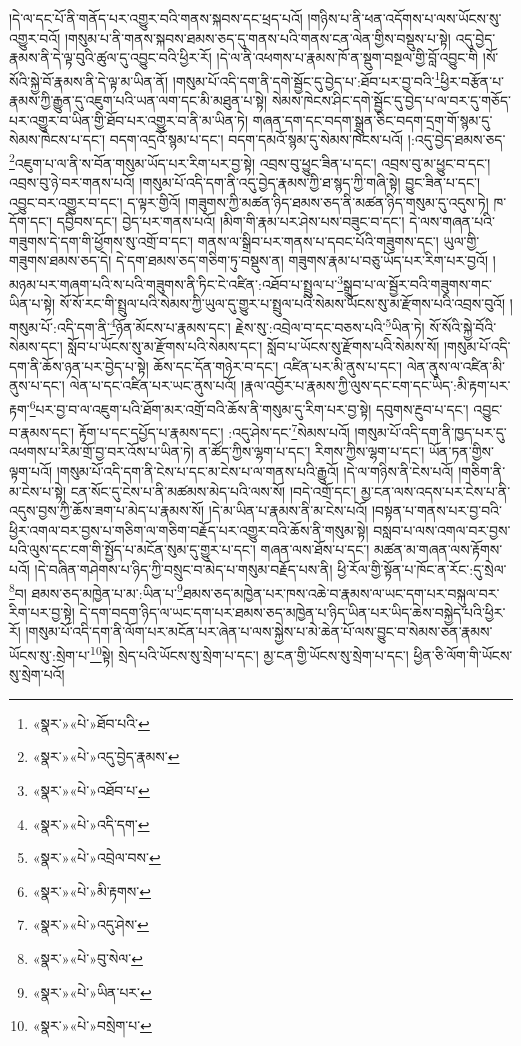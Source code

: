 །དེ་ལ་དང་པོ་ནི་གནོད་པར་འགྱུར་བའི་གནས་སྐབས་དང་ཕྲད་པའོ། །གཉིས་པ་ནི་ཕན་འདོགས་པ་ལས་ཡོངས་སུ་འགྱུར་བའོ། །གསུམ་པ་ནི་གནས་སྐབས་ཐམས་ཅད་དུ་གནས་པའི་གནས་ངན་ལེན་གྱིས་བསྡུས་པ་སྟེ། འདུ་བྱེད་རྣམས་ནི་དེ་ལྟ་བུའི་ཚུལ་དུ་འབྱུང་བའི་ཕྱིར་རོ། །དེ་ལ་ནི་འཕགས་པ་རྣམས་ཁོ་ན་སྡུག་བསྔལ་གྱི་བློ་འབྱུང་གི །སོ་སོའི་སྐྱེ་བོ་རྣམས་ནི་དེ་ལྟ་མ་ཡིན་ནོ། །གསུམ་པོ་འདི་དག་ནི་དགེ་སྦྱོང་དུ་བྱེད་པ་:ཐོབ་པར་བྱ་བའི་\footnote{«སྣར་»«པེ་»ཐོབ་པའི་}ཕྱིར་བརྩོན་པ་རྣམས་ཀྱི་རྒྱུན་དུ་འཇུག་པའི་ཡན་ལག་དང་མི་མཐུན་པ་སྟེ། སེམས་ཁེངས་ཤིང་དགེ་སྦྱོང་དུ་བྱེད་པ་ལ་བར་དུ་གཅོད་པར་འགྱུར་བ་ཡིན་གྱི་ཐོབ་པར་འགྱུར་བ་ནི་མ་ཡིན་ཏེ། གཞན་དག་དང་བདག་སྒྲུན་ཅིང་བདག་དྲག་གོ་སྙམ་དུ་སེམས་ཁེངས་པ་དང་། བདག་འདྲའོ་སྙམ་པ་དང་། བདག་དམའོ་སྙམ་དུ་སེམས་ཁེངས་པའོ། །:འདུ་བྱེད་ཐམས་ཅད་\footnote{«སྣར་»«པེ་»འདུ་བྱེད་རྣམས་}འཇུག་པ་ལ་ནི་ས་བོན་གསུམ་ཡོད་པར་རིག་པར་བྱ་སྟེ། འབྲས་བུ་ཕྱུང་ཟིན་པ་དང་། འབྲས་བུ་མ་ཕྱུང་བ་དང་། འབྲས་བུ་ཉེ་བར་གནས་པའོ། །གསུམ་པོ་འདི་དག་ནི་འདུ་བྱེད་རྣམས་ཀྱི་ཐ་སྙད་ཀྱི་གཞི་སྟེ། བྱུང་ཟིན་པ་དང་། འབྱུང་བར་འགྱུར་བ་དང་། ད་ལྟར་གྱིའོ། །གཟུགས་ཀྱི་མཚན་ཉིད་ཐམས་ཅད་ནི་མཚན་ཉིད་གསུམ་དུ་འདུས་ཏེ། ཁ་དོག་དང་། དབྱིབས་དང་། བྱེད་པར་གནས་པའོ། །མིག་གི་རྣམ་པར་ཤེས་པས་བཟུང་བ་དང་། དེ་ལས་གཞན་པའི་གཟུགས་དེ་དག་གི་ཕྱོགས་སུ་འགྲོ་བ་དང་། གནས་ལ་སྒྲིབ་པར་གནས་པ་དབང་པོའི་གཟུགས་དང་། ཡུལ་གྱི་གཟུགས་ཐམས་ཅད་དེ། དེ་དག་ཐམས་ཅད་གཅིག་ཏུ་བསྡུས་ན། གཟུགས་རྣམ་པ་བཅུ་ཡོད་པར་རིག་པར་བྱའོ། །མཉམ་པར་གཞག་པའི་ས་པའི་གཟུགས་ནི་ཏིང་ངེ་འཛིན་:འཐོབ་པ་སྤྲུལ་པ་\footnote{«སྣར་»«པེ་»འཐོབ་པ་}སྒྲུབ་པ་ལ་སྦྱོར་བའི་གཟུགས་གང་ཡིན་པ་སྟེ། སོ་སོ་རང་གི་སྤྲུལ་པའི་སེམས་ཀྱི་ཡུལ་དུ་གྱུར་པ་སྤྲུལ་པའི་སེམས་ཡོངས་སུ་མ་རྫོགས་པའི་འབྲས་བུའོ། །གསུམ་པོ་:འདི་དག་ནི་\footnote{«སྣར་»«པེ་»འདི་དག་}ཉོན་མོངས་པ་རྣམས་དང་། རྗེས་སུ་:འབྲེལ་བ་དང་བཅས་པའི་\footnote{«སྣར་»«པེ་»འབྲེལ་བས་}ཡིན་ཏེ། སོ་སོའི་སྐྱེ་བོའི་སེམས་དང་། སློབ་པ་ཡོངས་སུ་མ་རྫོགས་པའི་སེམས་དང་། སློབ་པ་ཡོངས་སུ་རྫོགས་པའི་སེམས་སོ། །གསུམ་པོ་འདི་དག་ནི་ཆོས་ཉན་པར་བྱེད་པ་སྟེ། ཆོས་དང་དོན་གཉེར་བ་དང་། འཛིན་པར་མི་ནུས་པ་དང་། ལེན་ནུས་ལ་འཛིན་མི་ནུས་པ་དང་། ལེན་པ་དང་འཛིན་པར་ཡང་ནུས་པའོ། །རྣལ་འབྱོར་པ་རྣམས་ཀྱི་ལུས་དང་ངག་དང་ཡིད་:མི་རྟག་པར་རྟག་\footnote{«སྣར་»«པེ་»མི་རྟགས་}པར་བྱ་བ་ལ་འཇུག་པའི་ཐོག་མར་འགྲོ་བའི་ཆོས་ནི་གསུམ་དུ་རིག་པར་བྱ་སྟེ། དབུགས་རྔུབ་པ་དང་། འབྱུང་བ་རྣམས་དང་། རྟོག་པ་དང་དཔྱོད་པ་རྣམས་དང་། :འདུ་ཤེས་དང་\footnote{«སྣར་»«པེ་»འདུ་ཤེས་}སེམས་པའོ། །གསུམ་པོ་འདི་དག་ནི་ཁྱད་པར་དུ་འཕགས་པ་རིམ་གྲོ་བྱ་བར་འོས་པ་ཡིན་ཏེ། ན་ཚོད་ཀྱིས་ལྷག་པ་དང་། རིགས་ཀྱིས་ལྷག་པ་དང་། ཡོན་ཏན་གྱིས་ལྟག་པའོ། །གསུམ་པོ་འདི་དག་ནི་ངེས་པ་དང་མ་ངེས་པ་ལ་གནས་པའི་རྒྱུའོ། །དེ་ལ་གཉིས་ནི་ངེས་པའོ། །གཅིག་ནི་མ་ངེས་པ་སྟེ། ངན་སོང་དུ་ངེས་པ་ནི་མཚམས་མེད་པའི་ལས་སོ། །བདེ་འགྲོ་དང་། མྱ་ངན་ལས་འདས་པར་ངེས་པ་ནི་འདུས་བྱས་ཀྱི་ཆོས་ཟག་པ་མེད་པ་རྣམས་སོ། །དེ་མ་ཡིན་པ་རྣམས་ནི་མ་ངེས་པའོ། །བསྟན་པ་གནས་པར་བྱ་བའི་ཕྱིར་འགལ་བར་བྱས་པ་གཅིག་ལ་གཅིག་བརྗོད་པར་འགྱུར་བའི་ཆོས་ནི་གསུམ་སྟེ། བསླབ་པ་ལས་འགལ་བར་བྱས་པའི་ལུས་དང་ངག་གི་སྤྱོད་པ་མངོན་སུམ་དུ་གྱུར་པ་དང་། གཞན་ལས་ཐོས་པ་དང་། མཚན་མ་གཞན་ལས་རྟོགས་པའོ། །དེ་བཞིན་གཤེགས་པ་ཉིད་ཀྱི་བསྲུང་བ་མེད་པ་གསུམ་བརྗོད་པས་ནི། ཕྱི་རོལ་གྱི་སྟོན་པ་ཁོང་ན་རོང་:དུ་སྲེལ་\footnote{«སྣར་»«པེ་»བུ་སེལ་}བ། ཐམས་ཅད་མཁྱེན་པ་མ་:ཡིན་པ་\footnote{«སྣར་»«པེ་»ཡིན་པར་}ཐམས་ཅད་མཁྱེན་པར་ཁས་འཆེ་བ་རྣམས་ལ་ཡང་དག་པར་བསྐུལ་བར་རིག་པར་བྱ་སྟེ། དེ་དག་བདག་ཉིད་ལ་ཡང་དག་པར་ཐམས་ཅད་མཁྱེན་པ་ཉིད་ཡིན་པར་ཡིད་ཆེས་བསྐྱེད་པའི་ཕྱིར་རོ། །གསུམ་པོ་འདི་དག་ནི་ལོག་པར་མངོན་པར་ཞེན་པ་ལས་སྐྱེས་པ་མེ་ཆེན་པོ་ལས་བྱུང་བ་སེམས་ཅན་རྣམས་ཡོངས་སུ་:སྲེག་པ་\footnote{«སྣར་»«པེ་»བསྲེག་པ་}སྟེ། སྲེད་པའི་ཡོངས་སུ་སྲེག་པ་དང་། མྱ་ངན་གྱི་ཡོངས་སུ་སྲེག་པ་དང་། ཕྱིན་ཅི་ལོག་གི་ཡོངས་སུ་སྲེག་པའོ། 